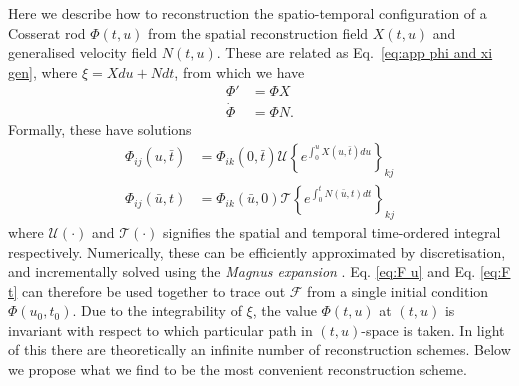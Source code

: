 \documentclass[]{cam-thesis}
\begin{document}
Here we describe how to reconstruction the spatio-temporal configuration of a Cosserat rod $\Phi(t,u)$ from the spatial reconstruction field $X(t,u)$ and generalised velocity field $N(t,u)$. These are related as Eq.~\ref{eq:app phi and xi gen}, where $\xi = X du + N dt$, from which we have
\begin{subequations} 
\begin{align}
\Phi' & =  \Phi X \label{eq:F u} \\
\dot{\Phi} & = \Phi  N \label{eq:F t}.
\end{align}
\end{subequations}
Formally, these have solutions
\begin{subequations} 
\begin{align}
\Phi_{ij}(u, \bar{t}) & = \Phi_{ik}(0, \bar{t}) \mathscr{U} \left\{ e^{ \int_0^u X(u, \bar{t}) du } \right\}_{kj} \\
\Phi_{ij}(\bar{u}, t) & = \Phi_{ik}(\bar{u}, 0) \mathscr{T} \left\{ e^{ \int_0^t N(\bar{u}, t) dt } \right\}_{kj}
\end{align}
\end{subequations}
where $\mathscr{U}(\cdot)$ and $\mathscr{T}(\cdot)$ signifies the spatial and temporal time-ordered integral respectively. Numerically, these can be efficiently approximated by discretisation, and incrementally solved using the \textit{Magnus expansion} \citep{magnusExponentialSolutionDifferential1954}. Eq. \ref{eq:F u} and Eq. \ref{eq:F t}
can therefore be used together to trace out $\mathcal{F}$
from a single initial condition $\Phi(u_{0}, t_{0})$. Due to
the integrability of $\xi$, the value $\Phi(t, u)$ at $(t, u)$ is invariant with respect to which particular path
in $(t, u)$-space is taken. In light of this there are theoretically
an infinite number of reconstruction schemes. Below we propose what
we find to be the most convenient reconstruction scheme.
\end{document}
